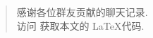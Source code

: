 \documentclass[a4paper, 9pt, twoside]{article}
\begin{document}

\setcounter{page}{1}   %

% 



\newpage
{} %


\null
\vfill

\begin{quote}
    \centering
    感谢各位群友贡献的聊天记录. \\
    访问  获取本文的 \LaTeX 代码. 
\end{quote}
\end{document}
